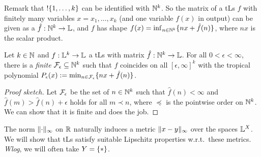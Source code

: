 \documentclass[submission,%
]{eptcs}
\begin{document}
Remark that $!\{1,\dots,k\}$ can be identified with $\mathbb{N}^k$.
So the matrix of a tLs $f$ with finitely many variables $x=x_1,\dots,x_k$ (and one variable $f(x)$ in output) can be given as a $\hat{f}:\mathbb{N}^k\to\mathbb{L}$, and $f$ has shape $f(x)=\inf_{n\in \mathbb{N}^k}\{nx+\hat{f}(n)\}$, where $nx$ is the scalar product.

\begin{theorem}\label{theorem:fepsilon}
 Let $k\in\mathbb{N}$ and $f:\mathbb{L}^k\to\mathbb{L}$ a tLs with matrix $\hat{f}:\mathbb{N}^k\to\mathbb{L}$.
 For all $0<\epsilon<\infty$, there is a \emph{finite} $\mathcal{F}_\epsilon \subseteq \mathbb{N}^k$ such that 
% 
$f$ coincides on all $[\epsilon,\infty]^k$ with the tropical {polynomial} $P_\epsilon(x):=\min_{n\in \mathcal{F}_\epsilon}\{nx+\hat{f}(n)\}$.
\end{theorem}
\begin{proof}[Proof sketch]
Let $\mathcal{F}_\epsilon$ be the set of $n\in\mathbb{N}^{k}$ such that 
$\widehat f(n)<\infty$ and $\widehat f(m)> \widehat f(n)+\epsilon$ holds for all $m\prec n$, where $\preceq$ is the pointwise order on $\mathbb{N}^k$.
We can show that it is finite and does the job.
\end{proof}



The norm $\lVert\cdot\rVert_\infty$ on $\mathbb{R}$ naturally induces a metric $\lVert x-y\rVert_{\infty}$ over the spaces $\mathbb{L}^{X}$.
We will show that tLs satisfy suitable Lipschitz properties  w.r.t.~these metrics.
\emph{Wlog}, we will often take $Y=\{*\}$. 
\end{document}
